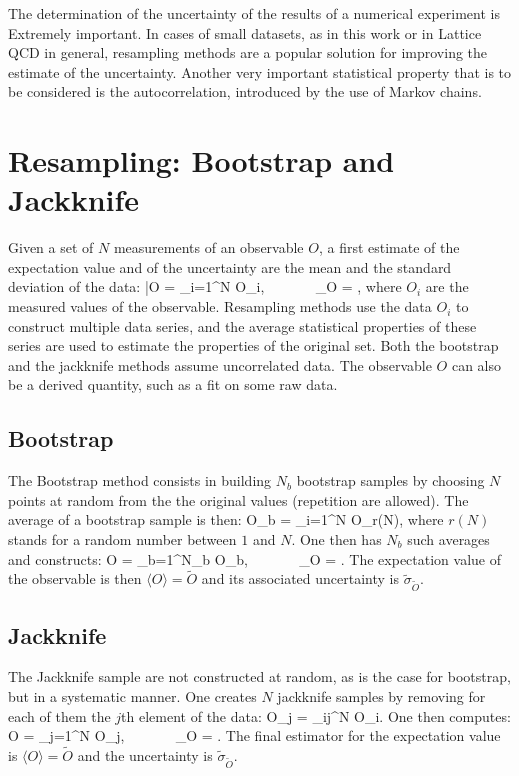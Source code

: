 The determination of the uncertainty of the results of a numerical experiment is Extremely important. In cases of small datasets, as in this work or in Lattice QCD in general, resampling methods are a popular solution for improving the estimate of the uncertainty. Another very important statistical property that is to be considered is the autocorrelation, introduced by the use of Markov chains.

\section{Resampling: Bootstrap and Jackknife}
Given a set of $N$ measurements of an observable $O$, a first estimate of the expectation value and of the uncertainty are the mean and the standard deviation of the data:
\beq
    \bar O = \sum_{i=1}^N O_i, ~~~~~~ \sigma_O = ,
\eeq
where $O_i$ are the measured values of the observable. Resampling methods use the data $O_i$ to construct multiple data series, and the average statistical properties of these series are used to estimate the properties of the original set. Both the bootstrap and the jackknife methods assume uncorrelated data. The observable $O$ can also be a derived quantity, such as a fit on some raw data.

\subsection{Bootstrap}
\label{app:resampling}
The Bootstrap method consists in building $N_b$ bootstrap samples by choosing $N$ points at random from the the original values (repetition are allowed). The average of a bootstrap sample is then:
\beq
    \hat O_b = \sum_{i=1}^N O_{r(N)},
\eeq
where $r(N)$ stands for a random number between $1$ and $N$. One then has $N_b$ such averages and constructs:
\beq
    \tilde O = \sum_{b=1}^{N_b} \hat O_b, ~~~~~~ \tilde\sigma_{\tilde O} = .
\eeq
The expectation value of the observable is then $\langle O \rangle = \tilde O$ and its associated uncertainty is $\tilde\sigma_{\tilde O}$.

\subsection{Jackknife}
The Jackknife sample are not constructed at random, as is the case for bootstrap, but in a systematic manner. One creates $N$ jackknife samples by removing for each of them the $j$th element of the data:
\beq
\hat O_j = \sum_{i\neq j}^N O_i.
\eeq
One then computes:
\beq
\tilde O = \sum_{j=1}^{N} \hat O_j, ~~~~~~ \tilde\sigma_{\tilde O} = .
\eeq
The final estimator for the expectation value is  $\langle O \rangle = \tilde O$ and the uncertainty is $\tilde\sigma_{\tilde O}$.\\

